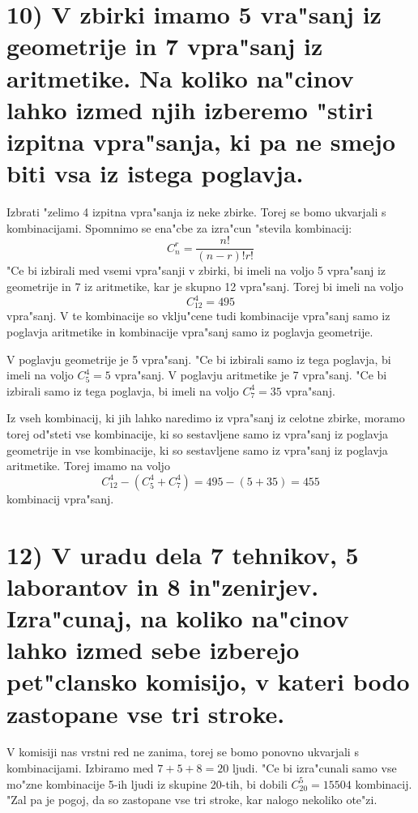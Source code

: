 \documentclass[a4paper, 12pt]{article}
\begin{document}
\section*{10) V zbirki imamo 5 vra"sanj iz geometrije in 7 vpra"sanj iz aritmetike. Na koliko na"cinov lahko izmed njih izberemo "stiri izpitna vpra"sanja, ki pa ne smejo biti vsa iz istega poglavja.}
Izbrati "zelimo 4 izpitna vpra"sanja iz neke zbirke. Torej se bomo ukvarjali s kombinacijami. Spomnimo se ena"cbe za izra"cun "stevila kombinacij:
\begin{equation*}
C_n^r = \dfrac{n!}{(n-r)!r!}
\end{equation*}
"Ce bi izbirali med vsemi vpra"sanji v zbirki, bi imeli na voljo 5 vpra"sanj iz geometrije in 7 iz aritmetike, kar je skupno 12 vpra"sanj. Torej bi imeli na voljo
\begin{equation*}
C_{12}^4 = 495
\end{equation*}
vpra"sanj. V te kombinacije so vklju"cene tudi kombinacije vpra"sanj samo iz poglavja aritmetike in kombinacije vpra"sanj samo iz poglavja geometrije.

V poglavju geometrije je 5 vpra"sanj. "Ce bi izbirali samo iz tega poglavja, bi imeli na voljo $C_5^4 = 5$ vpra"sanj. V poglavju aritmetike je 7 vpra"sanj. "Ce bi izbirali samo iz tega poglavja, bi imeli na voljo $C_7^4 = 35$ vpra"sanj.

Iz vseh kombinacij, ki jih lahko naredimo iz vpra"sanj iz celotne zbirke, moramo torej od"steti vse kombinacije, ki so sestavljene samo iz vpra"sanj iz poglavja geometrije in vse kombinacije, ki so sestavljene samo iz vpra"sanj iz poglavja aritmetike. Torej imamo na voljo
\begin{equation*}
C_{12}^4 - (C_5^4 + C_7^4) = 495 - (5 + 35) = 455
\end{equation*}
kombinacij vpra"sanj.

\section{12) V uradu dela 7 tehnikov, 5 laborantov in 8 in"zenirjev. Izra"cunaj, na koliko na"cinov lahko izmed sebe izberejo pet"clansko komisijo, v kateri bodo zastopane vse tri stroke.}
V komisiji nas vrstni red ne zanima, torej se bomo ponovno ukvarjali s kombinacijami. Izbiramo med $7 + 5 + 8 = 20$ ljudi. "Ce bi izra"cunali samo vse mo"zne kombinacije 5-ih ljudi iz skupine 20-tih, bi dobili $C_{20}^5 = 15504$ kombinacij. "Zal pa je pogoj, da so zastopane vse tri stroke, kar nalogo nekoliko ote"zi.
\end{document}

